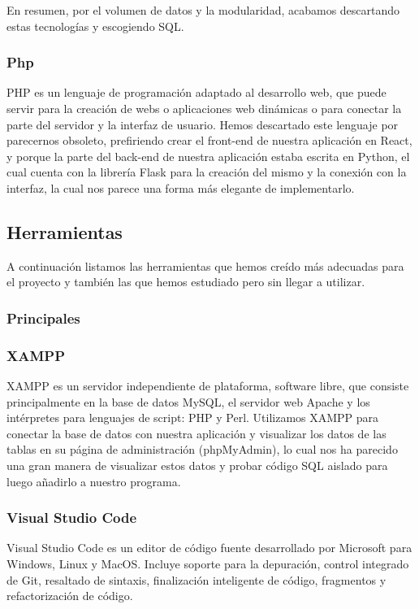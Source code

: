  			En resumen, por el volumen de datos y la modularidad, acabamos descartando estas tecnologías y escogiendo SQL.
 			
 		\subsubsection*{Php}
 			PHP es un lenguaje de programación adaptado al desarrollo web, que puede servir para la creación de webs o aplicaciones web dinámicas o para conectar la parte del servidor y la interfaz de usuario. Hemos descartado este lenguaje por parecernos obsoleto, prefiriendo crear el front-end de nuestra aplicación en React, y porque la parte del back-end de nuestra aplicación estaba escrita en Python, el cual cuenta con la librería Flask para la creación del mismo y la conexión con la interfaz, la cual nos parece una forma más elegante de implementarlo.
 			
 	\subsection{Herramientas}
 	
 		A continuación listamos las herramientas que hemos creído más adecuadas para el proyecto y también las que hemos estudiado pero sin llegar a utilizar.
 		
 	\subsubsection{Principales}		
 		\subsubsection*{XAMPP}
			XAMPP es un servidor independiente de plataforma, software libre, que consiste principalmente en la base de datos MySQL, el servidor web Apache y los intérpretes para lenguajes de script: PHP y Perl.   
			Utilizamos XAMPP para conectar la base de datos con nuestra aplicación y visualizar los datos de las tablas en su página de administración (phpMyAdmin), lo cual nos ha parecido una gran manera de visualizar estos datos y probar código SQL aislado para luego añadirlo a nuestro programa.
			
 		\subsubsection*{Visual Studio Code}
			Visual Studio Code es un editor de código fuente desarrollado por Microsoft para Windows, Linux y MacOS. Incluye soporte para la depuración, control integrado de Git, resaltado de sintaxis, finalización inteligente de código, fragmentos y refactorización de código. 
			  
